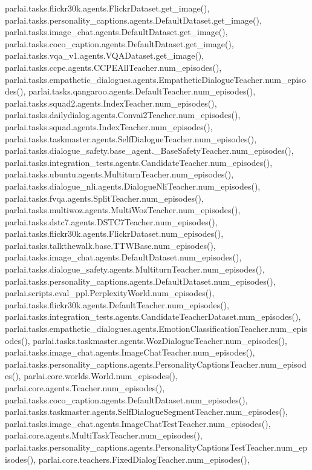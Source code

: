 parlai.\+tasks.\+flickr30k.\+agents.\+Flickr\+Dataset.\+get\+\_\+image(), parlai.\+tasks.\+personality\+\_\+captions.\+agents.\+Default\+Dataset.\+get\+\_\+image(), parlai.\+tasks.\+image\+\_\+chat.\+agents.\+Default\+Dataset.\+get\+\_\+image(), parlai.\+tasks.\+coco\+\_\+caption.\+agents.\+Default\+Dataset.\+get\+\_\+image(), parlai.\+tasks.\+vqa\+\_\+v1.\+agents.\+V\+Q\+A\+Dataset.\+get\+\_\+image(), parlai.\+tasks.\+ccpe.\+agents.\+C\+C\+P\+E\+All\+Teacher.\+num\+\_\+episodes(), parlai.\+tasks.\+empathetic\+\_\+dialogues.\+agents.\+Empathetic\+Dialogue\+Teacher.\+num\+\_\+episodes(), parlai.\+tasks.\+qangaroo.\+agents.\+Default\+Teacher.\+num\+\_\+episodes(), parlai.\+tasks.\+squad2.\+agents.\+Index\+Teacher.\+num\+\_\+episodes(), parlai.\+tasks.\+dailydialog.\+agents.\+Convai2\+Teacher.\+num\+\_\+episodes(), parlai.\+tasks.\+squad.\+agents.\+Index\+Teacher.\+num\+\_\+episodes(), parlai.\+tasks.\+taskmaster.\+agents.\+Self\+Dialogue\+Teacher.\+num\+\_\+episodes(), parlai.\+tasks.\+dialogue\+\_\+safety.\+base\+\_\+agent.\+\_\+\+Base\+Safety\+Teacher.\+num\+\_\+episodes(), parlai.\+tasks.\+integration\+\_\+tests.\+agents.\+Candidate\+Teacher.\+num\+\_\+episodes(), parlai.\+tasks.\+ubuntu.\+agents.\+Multiturn\+Teacher.\+num\+\_\+episodes(), parlai.\+tasks.\+dialogue\+\_\+nli.\+agents.\+Dialogue\+Nli\+Teacher.\+num\+\_\+episodes(), parlai.\+tasks.\+fvqa.\+agents.\+Split\+Teacher.\+num\+\_\+episodes(), parlai.\+tasks.\+multiwoz.\+agents.\+Multi\+Woz\+Teacher.\+num\+\_\+episodes(), parlai.\+tasks.\+dstc7.\+agents.\+D\+S\+T\+C7\+Teacher.\+num\+\_\+episodes(), parlai.\+tasks.\+flickr30k.\+agents.\+Flickr\+Dataset.\+num\+\_\+episodes(), parlai.\+tasks.\+talkthewalk.\+base.\+T\+T\+W\+Base.\+num\+\_\+episodes(), parlai.\+tasks.\+image\+\_\+chat.\+agents.\+Default\+Dataset.\+num\+\_\+episodes(), parlai.\+tasks.\+dialogue\+\_\+safety.\+agents.\+Multiturn\+Teacher.\+num\+\_\+episodes(), parlai.\+tasks.\+personality\+\_\+captions.\+agents.\+Default\+Dataset.\+num\+\_\+episodes(), parlai.\+scripts.\+eval\+\_\+ppl.\+Perplexity\+World.\+num\+\_\+episodes(), parlai.\+tasks.\+flickr30k.\+agents.\+Default\+Teacher.\+num\+\_\+episodes(), parlai.\+tasks.\+integration\+\_\+tests.\+agents.\+Candidate\+Teacher\+Dataset.\+num\+\_\+episodes(), parlai.\+tasks.\+empathetic\+\_\+dialogues.\+agents.\+Emotion\+Classification\+Teacher.\+num\+\_\+episodes(), parlai.\+tasks.\+taskmaster.\+agents.\+Woz\+Dialogue\+Teacher.\+num\+\_\+episodes(), parlai.\+tasks.\+image\+\_\+chat.\+agents.\+Image\+Chat\+Teacher.\+num\+\_\+episodes(), parlai.\+tasks.\+personality\+\_\+captions.\+agents.\+Personality\+Captions\+Teacher.\+num\+\_\+episodes(), parlai.\+core.\+worlds.\+World.\+num\+\_\+episodes(), parlai.\+core.\+agents.\+Teacher.\+num\+\_\+episodes(), parlai.\+tasks.\+coco\+\_\+caption.\+agents.\+Default\+Dataset.\+num\+\_\+episodes(), parlai.\+tasks.\+taskmaster.\+agents.\+Self\+Dialogue\+Segment\+Teacher.\+num\+\_\+episodes(), parlai.\+tasks.\+image\+\_\+chat.\+agents.\+Image\+Chat\+Test\+Teacher.\+num\+\_\+episodes(), parlai.\+core.\+agents.\+Multi\+Task\+Teacher.\+num\+\_\+episodes(), parlai.\+tasks.\+personality\+\_\+captions.\+agents.\+Personality\+Captions\+Test\+Teacher.\+num\+\_\+episodes(), parlai.\+core.\+teachers.\+Fixed\+Dialog\+Teacher.\+num\+\_\+episodes(), 